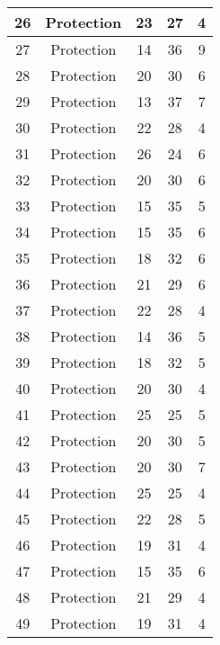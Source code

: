 \documentclass[results.tex]{subfiles}
\begin{document}
\begin{center}
\begin{tabular}{| c || c | c | c | c |}
    \hline
    26 & Protection & 23 & 27 & 4 \\ 
    \hline
    27 & Protection & 14 & 36 & 9 \\ 
    \hline
    28 & Protection & 20 & 30 & 6 \\ 
    \hline
    29 & Protection & 13 & 37 & 7 \\ 
    \hline
    30 & Protection & 22 & 28 & 4 \\ 
    \hline
    31 & Protection & 26 & 24 & 6 \\ 
    \hline
    32 & Protection & 20 & 30 & 6 \\ 
    \hline
    33 & Protection & 15 & 35 & 5 \\ 
    \hline
    34 & Protection & 15 & 35 & 6 \\ 
    \hline
    35 & Protection & 18 & 32 & 6 \\ 
    \hline
    36 & Protection & 21 & 29 & 6 \\ 
    \hline
    37 & Protection & 22 & 28 & 4 \\ 
    \hline
    38 & Protection & 14 & 36 & 5 \\ 
    \hline
    39 & Protection & 18 & 32 & 5 \\ 
    \hline
    40 & Protection & 20 & 30 & 4 \\ 
    \hline
    41 & Protection & 25 & 25 & 5 \\ 
    \hline
    42 & Protection & 20 & 30 & 5 \\ 
    \hline
    43 & Protection & 20 & 30 & 7 \\ 
    \hline
    44 & Protection & 25 & 25 & 4 \\ 
    \hline
    45 & Protection & 22 & 28 & 5 \\ 
    \hline
    46 & Protection & 19 & 31 & 4 \\ 
    \hline
    47 & Protection & 15 & 35 & 6 \\ 
    \hline
    48 & Protection & 21 & 29 & 4 \\ 
    \hline
    49 & Protection & 19 & 31 & 4 \\ 
    \hline   \end{tabular}
\end{center}
\end{document}

